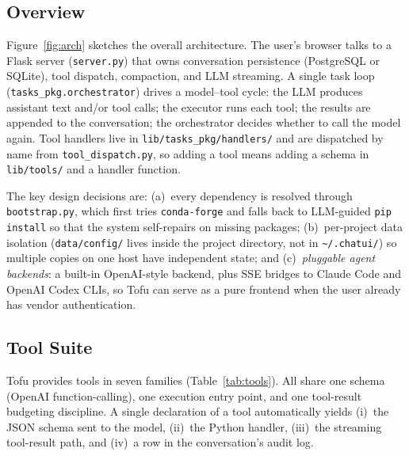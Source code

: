 \documentclass[11pt]{article}
\begin{document}
\subsection{Overview}

Figure~\ref{fig:arch} sketches the overall architecture. The user's
browser talks to a Flask server (\texttt{server.py}) that owns
conversation persistence (PostgreSQL or SQLite), tool dispatch,
compaction, and LLM streaming. A single task loop
(\texttt{tasks\_pkg.orchestrator}) drives a model--tool cycle: the LLM
produces assistant text and/or tool calls; the executor runs each tool;
the results are appended to the conversation; the orchestrator decides
whether to call the model again. Tool handlers live in
\texttt{lib/tasks\_pkg/handlers/} and are dispatched by name from
\texttt{tool\_dispatch.py}, so adding a tool means adding a schema in
\texttt{lib/tools/} and a handler function.


The key design decisions are: (a)~every dependency is resolved through
\texttt{bootstrap.py}, which first tries \texttt{conda-forge} and falls
back to LLM-guided \texttt{pip install} so that the system self-repairs
on missing packages; (b)~per-project data isolation
(\texttt{data/config/} lives inside the project directory, not in
\texttt{\textasciitilde/.chatui/}) so multiple copies on one host have
independent state; and (c)~\emph{pluggable agent backends}: a built-in
OpenAI-style backend, plus SSE bridges to Claude Code and OpenAI Codex
CLIs, so Tofu can serve as a pure frontend when the user already has
vendor authentication.

\subsection{Tool Suite}

Tofu provides tools in seven families (Table~\ref{tab:tools}).
All share one schema (OpenAI function-calling), one execution entry
point, and one tool-result budgeting discipline. A single declaration of
a tool automatically yields (i)~the JSON schema sent to the model,
(ii)~the Python handler, (iii)~the streaming tool-result path, and
(iv)~a row in the conversation's audit log.
\end{document}

